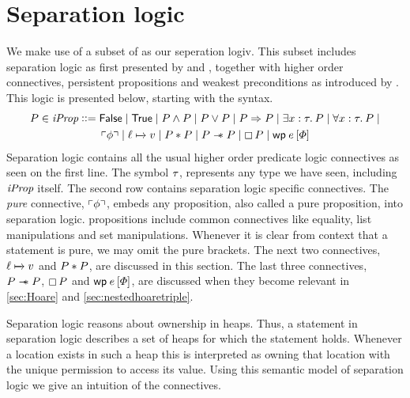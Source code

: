 \documentclass[thesis.tex]{subfiles}
\begin{document}
\section{Separation logic}
\label{sec:seplogic}
We make use of a subset of \iris \cite{jungIrisGroundModular2018} as our seperation logiv. This subset includes separation logic as first presented by  and  \cite*{ishtiaqBIAssertionLanguage2001,reynoldsSeparationLogicLogic2002}, together with higher order connectives, persistent propositions and weakest preconditions as introduced by \iris. This logic is presented below, starting with the syntax.
\begin{align*}
  \prop \in \iProp \bnfdef{} & \FALSE \mid \TRUE \mid \prop \land \prop \mid \prop \lor \prop \mid \prop \Ra \prop \mid \Exists \var:\type. \prop \mid \All \var:\type. \prop \mid \\
                             & \pure{\pprop} \mid \loc \fmapsto \val \mid \prop * \prop \mid \prop \wand \prop \mid \always\prop \mid \wpre\expr{\pred}
\end{align*}
Separation logic contains all the usual higher order predicate logic connectives as seen on the first line. The symbol $\tau$, represents any type we have seen, including $\textit{iProp}$ itself. The second row contains separation logic specific connectives. The \emph{pure} connective, $\left\ulcorner \phi \right\urcorner$, embeds any \coq proposition, also called a pure proposition, into separation logic. \coq propositions include common connectives like equality, list manipulations and set manipulations. Whenever it is clear from context that a statement is pure, we may omit the pure brackets. The next two connectives, $\loc \fmapsto \val$ and $P * P$, are discussed in this section. The last three connectives, $P \mathrel{-\!\!\ast} P$, $\mathop{\boxempty}P$ and $\wpre\expr{\pred}$, are discussed when they become relevant in \cref*{sec:Hoare} and \cref*{sec:nestedhoaretriple}.

Separation logic reasons about ownership in heaps. Thus, a statement in separation logic describes a set of heaps for which the statement holds. Whenever a location exists in such a heap this is interpreted as owning that location with the unique permission to access its value. Using this semantic model of separation logic we give an intuition of the connectives.
\end{document}
